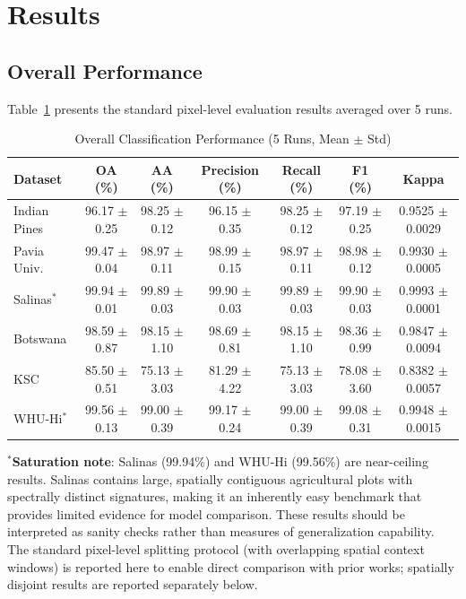 \documentclass[conference]{IEEEtran}
\begin{document}
\section{Results}

\subsection{Overall Performance}

Table~\ref{tab:overall_results} presents the standard pixel-level evaluation results averaged over 5 runs.

\begin{table}[!t]
\caption{Overall Classification Performance (5 Runs, Mean $\pm$ Std)}
\label{tab:overall_results}
\centering
\begin{tabular}{lcccccc}
\toprule
\textbf{Dataset} & \textbf{OA (\%)} & \textbf{AA (\%)} & \textbf{Precision (\%)} & \textbf{Recall (\%)} & \textbf{F1 (\%)} & \textbf{Kappa} \\
\midrule
Indian Pines & 96.17 $\pm$ 0.25 & 98.25 $\pm$ 0.12 & 96.15 $\pm$ 0.35 & 98.25 $\pm$ 0.12 & 97.19 $\pm$ 0.25 & 0.9525 $\pm$ 0.0029 \\
Pavia Univ. & 99.47 $\pm$ 0.04 & 98.97 $\pm$ 0.11 & 98.99 $\pm$ 0.15 & 98.97 $\pm$ 0.11 & 98.98 $\pm$ 0.12 & 0.9930 $\pm$ 0.0005 \\
Salinas$^*$ & 99.94 $\pm$ 0.01 & 99.89 $\pm$ 0.03 & 99.90 $\pm$ 0.03 & 99.89 $\pm$ 0.03 & 99.90 $\pm$ 0.03 & 0.9993 $\pm$ 0.0001 \\
Botswana & 98.59 $\pm$ 0.87 & 98.15 $\pm$ 1.10 & 98.69 $\pm$ 0.81 & 98.15 $\pm$ 1.10 & 98.36 $\pm$ 0.99 & 0.9847 $\pm$ 0.0094 \\
KSC & 85.50 $\pm$ 0.51 & 75.13 $\pm$ 3.03 & 81.29 $\pm$ 4.22 & 75.13 $\pm$ 3.03 & 78.08 $\pm$ 3.60 & 0.8382 $\pm$ 0.0057 \\
WHU-Hi$^*$ & 99.56 $\pm$ 0.13 & 99.00 $\pm$ 0.39 & 99.17 $\pm$ 0.24 & 99.00 $\pm$ 0.39 & 99.08 $\pm$ 0.31 & 0.9948 $\pm$ 0.0015 \\
\bottomrule
\end{tabular}
\begin{flushleft}
\footnotesize{$^*$\textbf{Saturation note}: Salinas (99.94\%) and WHU-Hi (99.56\%) are near-ceiling results. Salinas contains large, spatially contiguous agricultural plots with spectrally distinct signatures, making it an inherently easy benchmark that provides limited evidence for model comparison. These results should be interpreted as sanity checks rather than measures of generalization capability. The standard pixel-level splitting protocol (with overlapping spatial context windows) is reported here to enable direct comparison with prior works; spatially disjoint results are reported separately below.}
\end{flushleft}
\end{table}
\end{document}
